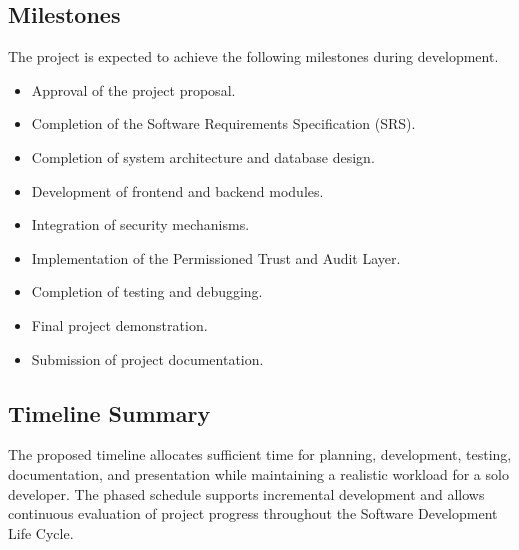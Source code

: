 
\subsection{Milestones}

The project is expected to achieve the following milestones during development.

\begin{itemize}

\item Approval of the project proposal.

\item Completion of the Software Requirements Specification (SRS).

\item Completion of system architecture and database design.

\item Development of frontend and backend modules.

\item Integration of security mechanisms.

\item Implementation of the Permissioned Trust and Audit Layer.

\item Completion of testing and debugging.

\item Final project demonstration.

\item Submission of project documentation.

\end{itemize}


\subsection{Timeline Summary}

The proposed timeline allocates sufficient time for planning, development, testing, documentation, and presentation while maintaining a realistic workload for a solo developer. The phased schedule supports incremental development and allows continuous evaluation of project progress throughout the Software Development Life Cycle.